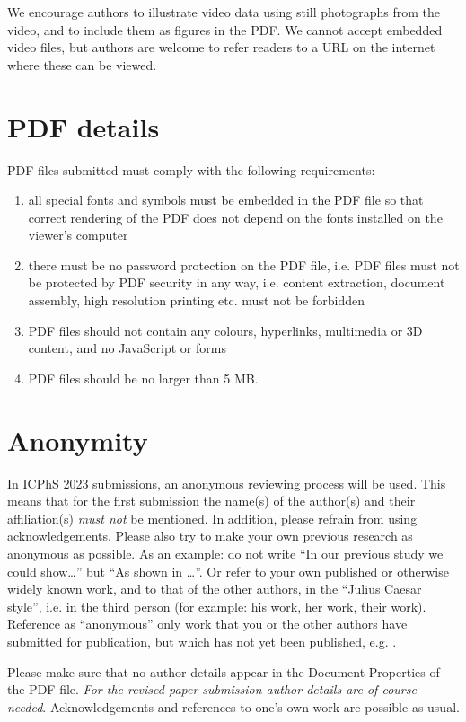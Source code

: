 \documentclass[a4paper,11pt,twocolumn]{article}
\begin{document}
We encourage authors to illustrate video data using still photographs from the video, and to include them as figures in the PDF.  We cannot accept embedded video files, but authors are welcome to refer readers to a URL on the internet where these can be viewed.


\section{PDF details}

PDF files submitted must comply with the following requirements:

\begin{enumerate}
\item all special fonts and symbols must be embedded in the PDF
  file so that correct rendering of the PDF does not depend on the
  fonts installed on the viewer's computer
\item there must be no
  password protection on the PDF file, i.e. PDF files must not be
  protected by PDF security in any way, i.e. content extraction,
  document assembly, high resolution printing etc. must not be
  forbidden
\item PDF files should not contain any colours, hyperlinks,
  multimedia or 3D content, and no JavaScript or forms
\item PDF files
  should be no larger than 5 MB.
\end{enumerate}
\section{Anonymity}

In ICPhS 2023 submissions, an anonymous reviewing process will be used. This means that for the first submission the name(s) of the author(s) and
their affiliation(s) \emph{must not} be mentioned. In addition, please refrain from using acknowledgements.  Please also try to make your own previous research as anonymous as possible. As an example: do not write ``In our previous study \cite{Stevens:1999} we could show\ldots'' but ``As shown in \cite{Stevens:1999}\ldots''. Or refer to your own published or otherwise widely known work, and to that of the other authors, in the ``Julius Caesar style'', i.e. in the third person (for example: his work, her work, their work). Reference as ``anonymous'' only work that you or the other authors have submitted for publication, but which has not yet been published, e.g. \cite{Anonymous:submitted}.

Please make sure that no author details appear in the Document Properties of the PDF file. \emph{For the revised paper submission author details are of course needed}. Acknowledgements and references to one's own work are possible as usual.
\end{document}
